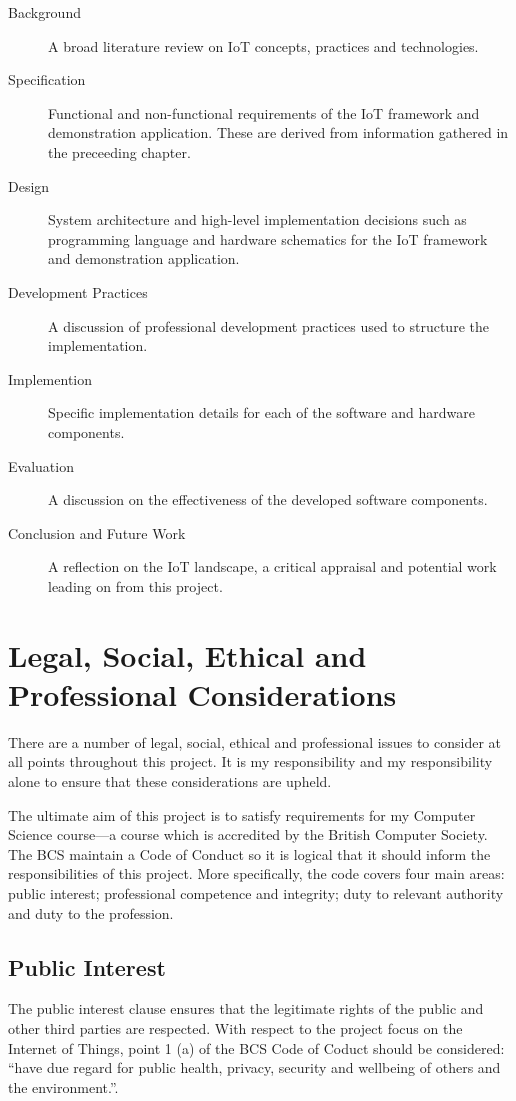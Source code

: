     \begin{description}
      \item[Background] A broad literature review on IoT concepts, practices and technologies.
      \item[Specification] Functional and non-functional requirements of the IoT framework and demonstration application. These are derived from information gathered in the preceeding chapter.
      \item[Design] System architecture and high-level implementation decisions such as programming language and hardware schematics for the IoT framework and demonstration application.
      \item[Development Practices] A discussion of professional development practices used to structure the implementation.
      \item[Implemention] Specific implementation details for each of the software and hardware components.
      \item[Evaluation] A discussion on the effectiveness of the developed software components.
      \item[Conclusion and Future Work] A reflection on the IoT landscape, a critical appraisal and potential work leading on from this project.

    \end{description}

  \section{Legal, Social, Ethical and Professional Considerations}
  \label{chapter:profession-considerations}
    There are a number of legal, social, ethical and professional issues to consider at all points throughout this project. It is my responsibility and my responsibility alone to ensure that these considerations are upheld.

    The ultimate aim of this project is to satisfy requirements for my Computer Science course---a course which is accredited by the British Computer Society. The BCS maintain a Code of Conduct \citep{bcs-coc} so it is logical that it should inform the responsibilities of this project. More specifically, the code covers four main areas: public interest; professional competence and integrity; duty to relevant authority and duty to the profession.

    \subsection{Public Interest}
      The public interest clause ensures that the legitimate rights of the public and other third parties are respected. With respect to the project focus on the Internet of Things, point 1 (a) of the BCS Code of Coduct should be considered: ``have due regard for public health, privacy, security and wellbeing of others and the environment.''.

